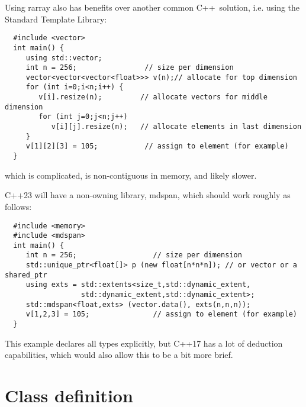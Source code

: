 \documentclass[11pt,twoside]{article}
\newcommand{\cxx}{C{++}}
\begin{document}
Using rarray also has benefits over another common \cxx\ 
solution, i.e. using the Standard Template Library:
\vspace{-5pt}\begin{framed}\vspace{-14pt}%
\begin{verbatim}
  #include <vector>
  int main() {
     using std::vector;
     int n = 256;                // size per dimension
     vector<vector<vector<float>>> v(n);// allocate for top dimension
     for (int i=0;i<n;i++) {
        v[i].resize(n);         // allocate vectors for middle dimension
        for (int j=0;j<n;j++) 
           v[i][j].resize(n);   // allocate elements in last dimension
     }
     v[1][2][3] = 105;           // assign to element (for example)
  }
\end{verbatim}%
\vspace{-14pt}\end{framed}\vspace{-8pt}
\noindent
which is complicated, is non-contiguous in memory, and likely
slower.

C++23 will have a non-owning library, mdspan, which should work
roughly as follows:
\vspace{-5pt}\begin{framed}\vspace{-14pt}%
\begin{verbatim}
  #include <memory>
  #include <mdspan>
  int main() {
     int n = 256;                  // size per dimension
     std::unique_ptr<float[]> p (new float[n*n*n]); // or vector or a shared_ptr
     using exts = std::extents<size_t,std::dynamic_extent,
                  std::dynamic_extent,std::dynamic_extent>;
     std::mdspan<float,exts> (vector.data(), exts(n,n,n));
     v[1,2,3] = 105;               // assign to element (for example)
  }
\end{verbatim}%
\vspace{-14pt}\end{framed}\vspace{-8pt}
This example declares all types explicitly, but C++17 has a lot of
deduction capabilities, which would also allow this to be a bit more brief. 


\pagebreak[4]
\section{Class definition}
\end{document}

